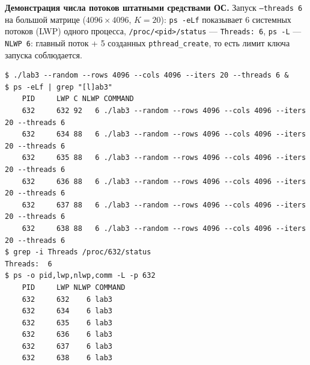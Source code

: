 \textbf{Демонстрация числа потоков штатными средствами ОС.} Запуск \texttt{--threads 6} на
большой матрице ($4096\times4096$, $K=20$): \texttt{ps -eLf} показывает 6 системных потоков
(LWP) одного процесса, \texttt{/proc/<pid>/status} --- \texttt{Threads: 6}, \texttt{ps -L} ---
\texttt{NLWP 6}: главный поток + 5 созданных \texttt{pthread\_create}, то есть лимит ключа
запуска соблюдается.

\begin{lstlisting}[caption={ps -eLf / /proc/<pid>/status при --threads 6},captionpos=b]
$ ./lab3 --random --rows 4096 --cols 4096 --iters 20 --threads 6 &
$ ps -eLf | grep "[l]ab3"
    PID     LWP C NLWP COMMAND
    632     632 92   6 ./lab3 --random --rows 4096 --cols 4096 --iters 20 --threads 6
    632     634 88   6 ./lab3 --random --rows 4096 --cols 4096 --iters 20 --threads 6
    632     635 88   6 ./lab3 --random --rows 4096 --cols 4096 --iters 20 --threads 6
    632     636 88   6 ./lab3 --random --rows 4096 --cols 4096 --iters 20 --threads 6
    632     637 88   6 ./lab3 --random --rows 4096 --cols 4096 --iters 20 --threads 6
    632     638 88   6 ./lab3 --random --rows 4096 --cols 4096 --iters 20 --threads 6
$ grep -i Threads /proc/632/status
Threads:  6
$ ps -o pid,lwp,nlwp,comm -L -p 632
    PID     LWP NLWP COMMAND
    632     632    6 lab3
    632     634    6 lab3
    632     635    6 lab3
    632     636    6 lab3
    632     637    6 lab3
    632     638    6 lab3
\end{lstlisting}
\pagebreak
